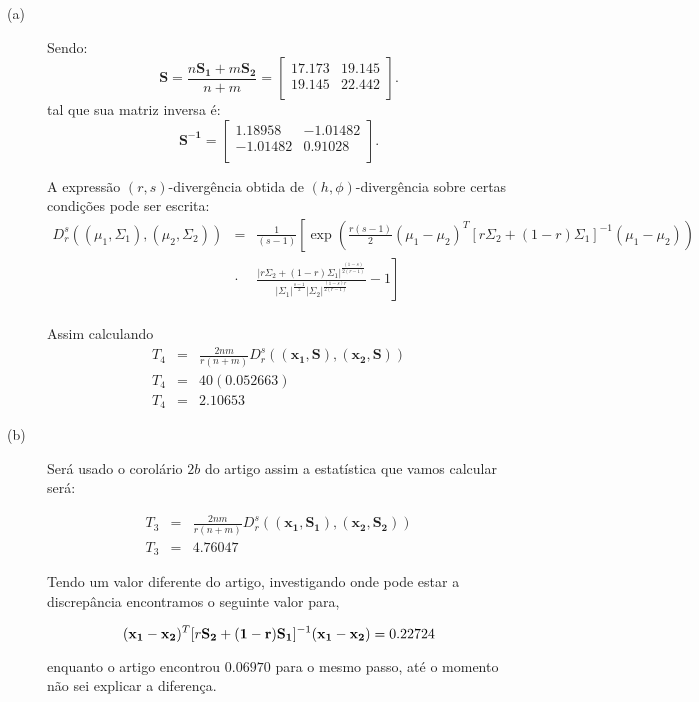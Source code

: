 \begin{description}
\item[(a)] Sendo:
$$
		\mathbf{S}=\frac{n\mathbf{S_1}+m\mathbf{S_2}}{n+m} = \left[
\begin{array}{cc}
	 17.173  & 19.145   \\
         19.145  & 22.442   \\
\end{array}
\right].
$$
tal que sua matriz inversa é:
$$
		\mathbf{S^{-1}} = \left[
\begin{array}{cc}
	 1.18958  & -1.01482   \\
        -1.01482  & 0.91028   \\
\end{array}
\right].
$$

		A expressão $(r,s)$-divergência obtida de $(h,\phi)$-divergência sobre certas condições pode ser escrita:
\begin{equation}\label{eqn84}
\begin{array}{ccl}
	D_r^s((\mu_1,\Sigma_1),(\mu_2,\Sigma_2))&=&\frac{1}{(s-1)}\left[\exp\left(\frac{r(s-1)}{2}(\mu_1-\mu_2)^{T}[r\Sigma_2+(1-r)\Sigma_1]^{-1}(\mu_1-\mu_2) \right)\right. \\
	&\cdot&\left.\frac{|r\Sigma_2+(1-r)\Sigma_1|^{\frac{(1-s)}{2(r-1)}}}{|\Sigma_1|^{\frac{s-1}{2}}|\Sigma_2|^{\frac{(1-s)r}{2(r-1)}}}-1\right]  \\
\end{array}
\end{equation}

Assim calculando
\begin{equation}\label{eqn85}
\begin{array}{ccc}
	T_4&=&\frac{2nm}{r(n+m)}D_r^s((\mathbf{x_1}, \mathbf{S}),(\mathbf{x_2}, \mathbf{S})) \\
	T_4&=&40(0.052663) \\
	T_4&=&2.10653
\end{array}
\end{equation}
\item[(b)] Será usado o corolário $2b$ do artigo \cite{smp} assim a estatística que vamos calcular será:

\begin{equation}\label{eqn86}
\begin{array}{ccc}
	T_3&=&\frac{2nm}{r(n+m)}D_r^s((\mathbf{x_1}, \mathbf{S_1}),(\mathbf{x_2}, \mathbf{S_2})) \\
	T_3&=&4.76047
\end{array}
\end{equation}

Tendo um valor diferente do artigo, investigando onde pode estar a discrepância encontramos o seguinte valor para, 

\begin{equation}\label{eqn87}
	(\mathbf{x_1}-\mathbf{x_2})^T [r\mathbf{S_2+(1-r)S_1}]^{-1}(\mathbf{x_1-x_2})= 0.22724\\
\end{equation}

enquanto o artigo encontrou $0.06970$ para o mesmo passo, até o momento não sei explicar a diferença.

\end{description}


